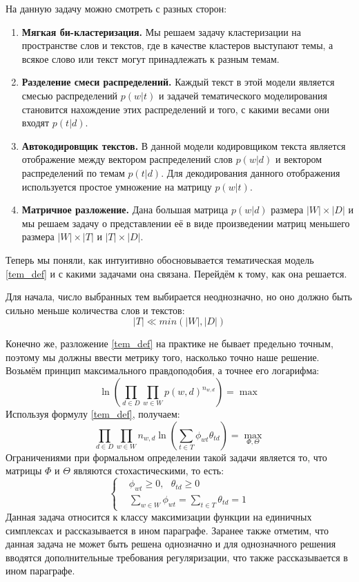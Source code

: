 \documentclass[a4paper, 12pt]{article}
\begin{document}
На данную задачу можно смотреть с разных сторон:
\begin{enumerate}
    \item \textbf{Мягкая би-кластеризация.} Мы решаем задачу кластеризации на пространстве слов и текстов, где в качестве кластеров выступают темы, а всякое слово или текст могут принадлежать к разным темам.
    \item \textbf{Разделение смеси распределений.} Каждый текст в этой модели является смесью распределений $p(w|t)$ и задачей тематического моделирования становится нахождение этих распределений и того, с какими весами они входят $p(t|d)$.
    \item \textbf{Автокодировщик текстов.} В данной модели кодировщиком текста является отображение между вектором распределений слов $p(w|d)$ и вектором распределений по темам $p(t|d)$. Для декодирования данного отображения используется простое умножение на матрицу $p(w|t)$.
    \item \textbf{Матричное разложение.} Дана большая матрица $p(w|d)$ размера $|W|\times|D|$ и мы решаем задачу о представлении её в виде произведении матриц меньшего размера $|W|\times|T|$ и $|T|\times|D|$.
\end{enumerate}

Теперь мы поняли, как интуитивно обосновывается тематическая модель \eqref{tem_def} и с какими задачами она связана. Перейдём к тому, как она решается.

Для начала, число выбранных тем выбирается неоднозначно, но оно должно быть сильно меньше количества слов и текстов:
\begin{equation}
    |T| \ll min(|W|, |D|)
\end{equation}

Конечно же, разложение \eqref{tem_def} на практике не бывает предельно точным, поэтому мы должны ввести метрику того, насколько точно наше решение. Возьмём принцип максимального правдоподобия, а точнее его логарифма:
\begin{equation}
    \ln\left(\prod\limits_{d\in D}\prod\limits_{w\in W} p(w, d)^{n_{w,d}}\right) = \max
\end{equation} 
Используя формулу \eqref{tem_def}, получаем:
\begin{equation}
    \prod\limits_{d\in D}\prod\limits_{w\in W}n_{w,d} \ln\left(\sum\limits_{t\in T} \phi_{wt} \theta_{td}\right) = \max\limits_{\Phi, \Theta}
\end{equation} 
Ограничениями при формальном определении такой задачи является то, что матрицы $\Phi$ и $\Theta$ являются стохастическими, то есть:
\begin{equation}
    \left\{
    \begin{aligned}
        &\phi_{wt} \geq 0, ~~~\theta_{td} \geq 0\\
        &\sum_{w\in W} \phi_{wt} = \sum_{t\in T} \theta_{td} = 1
    \end{aligned}
    \right.
\end{equation}
Данная задача относится к классу максимизации функции на единичных симплексах и рассказывается в ином параграфе. Заранее также отметим, что данная задача не может быть решена однозначно и для однозначного решения вводятся дополнительные требования регуляризации, что также рассказывается в ином параграфе.
\end{document}
